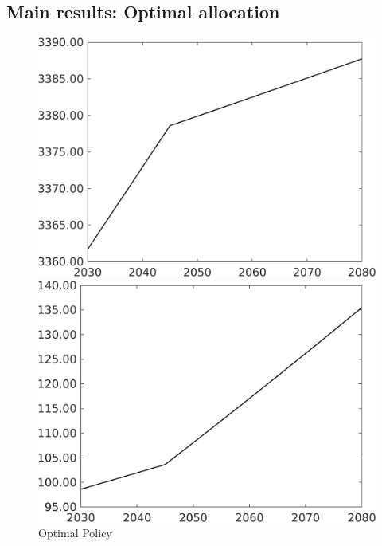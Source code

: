 \subsection{Main results: Optimal allocation}
\begin{figure}[h!!]
	\centering
	\caption{Optimal Policy }\label{fig:optAll}
	\begin{minipage}[]{0.32\textwidth}
		\includegraphics[width=1\textwidth]{../../codding_model/own_basedOnFried/optimalPol_elastS_DisuSci/figures/all_1705/Single_OPT_T_NoTaus_Af_spillover0_sep1_etaa1.00.png}
	\end{minipage}
	\begin{minipage}[]{0.32\textwidth}
		\includegraphics[width=1\textwidth]{../../codding_model/own_basedOnFried/optimalPol_elastS_DisuSci/figures/all_1705/Single_OPT_T_NoTaus_Ag_spillover0_sep1_etaa1.00.png}

\end{minipage}
\end{figure}
